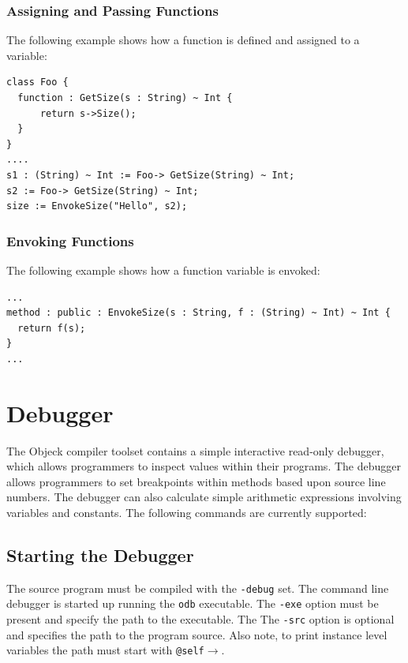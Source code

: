 \documentclass[12pt]{article}
\begin{document}
\subsubsection{Assigning and Passing Functions}
The following example shows how a function is defined and assigned to a variable:
\begin{verbatim}
class Foo {
  function : GetSize(s : String) ~ Int {
      return s->Size();
  }
}
....
s1 : (String) ~ Int := Foo-> GetSize(String) ~ Int;
s2 := Foo-> GetSize(String) ~ Int;
size := EnvokeSize("Hello", s2);
\end{verbatim}

\subsubsection{Envoking Functions}
The following example shows how a function variable is envoked:
\begin{verbatim}
...
method : public : EnvokeSize(s : String, f : (String) ~ Int) ~ Int {
  return f(s);
}
...
\end{verbatim}

\section{Debugger}
The Objeck compiler toolset contains a simple interactive read-only debugger, which allows programmers to inspect values within their programs.  The debugger allows programmers to set breakpoints within methods based upon source line numbers.  The debugger can also calculate simple arithmetic expressions involving variables and constants. The following commands are currently supported:

\subsection{Starting the Debugger}
The source program must be compiled with the \texttt{-debug} set. The command line debugger is started up running the \texttt{odb} executable. The \texttt{-exe} option must be present and specify the path to the executable.  The The \texttt{-src} option is optional and specifies the path to the program source.  Also note, to print instance level variables the path must start with \texttt{@self$\rightarrow$}. 
\end{document}
